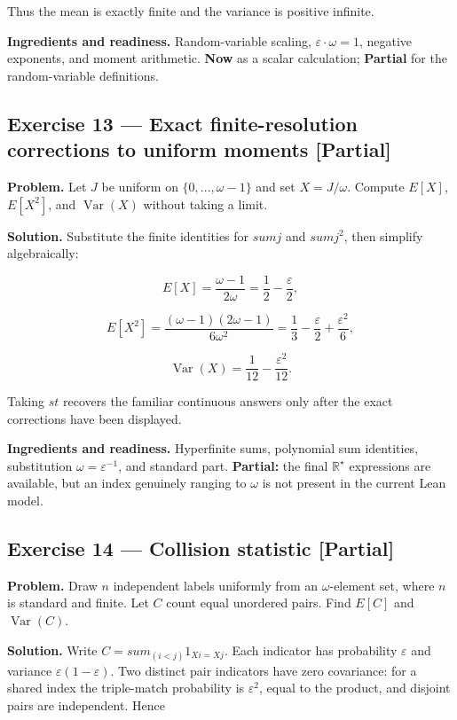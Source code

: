 \documentclass[11pt]{article}
\newcommand{\Rstar}{\mathbb{R}^{\star}}
\newcommand{\eps}{\varepsilon}
\renewcommand{\epsilon}{\varepsilon}
\newcommand{\Var}{\operatorname{Var}}
\begin{document}
Thus the mean is exactly finite and the variance is positive infinite.

\textbf{Ingredients and readiness.} Random-variable scaling, $\eps\cdot \omega=1$,
negative exponents, and moment arithmetic. \textbf{Now} as a scalar calculation;
\textbf{Partial} for the random-variable definitions.


\subsection*{Exercise 13 --- Exact finite-resolution corrections to uniform moments \hfill \normalfont\small[Partial]}

\textbf{Problem.} Let $J$ be uniform on $\{0,...,\omega-1\}$ and set
$X=J/\omega$. Compute $E[X]$, $E[X^2]$, and $\Var(X)$ without taking a limit.

\textbf{Solution.} Substitute the finite identities for $sum j$ and $sum j^2$,
then simplify algebraically:

\[
E[X]=\frac{\omega-1}{2\omega}
=\frac12-\frac\epsilon2,
\]

\[
E[X^2]=\frac{(\omega-1)(2\omega-1)}{6\omega^2}
=\frac13-\frac\epsilon2+\frac{\epsilon^2}{6},
\]

\[
\operatorname{Var}(X)=\frac1{12}-\frac{\epsilon^2}{12}.
\]

Taking $st$ recovers the familiar continuous answers only after the exact
corrections have been displayed.

\textbf{Ingredients and readiness.} Hyperfinite sums, polynomial sum identities,
substitution $\omega=\eps^{-1}$, and standard part. \textbf{Partial:} the final
$\Rstar$ expressions are available, but an index genuinely ranging to $\omega$
is not present in the current Lean model.


\subsection*{Exercise 14 --- Collision statistic \hfill \normalfont\small[Partial]}

\textbf{Problem.} Draw $n$ independent labels uniformly from an $\omega$-element
set, where $n$ is standard and finite. Let $C$ count equal unordered pairs.
Find $E[C]$ and $\Var(C)$.

\textbf{Solution.} Write
$C = sum_(i<j) 1_{Xi=Xj}$. Each indicator has probability $\eps$ and
variance $\eps(1-\eps)$. Two distinct pair indicators have zero
covariance: for a shared index the triple-match probability is $\eps^2$,
equal to the product, and disjoint pairs are independent. Hence
\end{document}
